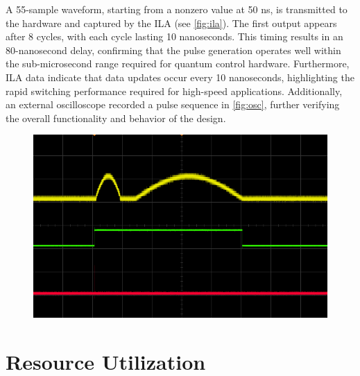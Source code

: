 A 55-sample waveform, starting from a nonzero value at 50 ns, is transmitted to the hardware and captured by the ILA (see \autoref{fig:ila}). The first output appears after 8 cycles, with each cycle lasting 10 nanoseconds. This timing results in an 80-nanosecond delay, confirming that the pulse generation operates well within the sub-microsecond range required for quantum control hardware. Furthermore, ILA data indicate that data updates occur every 10 nanoseconds, highlighting the rapid switching performance required for high-speed applications. Additionally, an external oscilloscope recorded a pulse sequence in \autoref{fig:osc}, further verifying the overall functionality and behavior of the design.
\begin{figure}[ht]
    \centering
    \includegraphics[width=.85\linewidth]{figures/one_trig_seq.png}
    \caption{}
    \label{fig:osc}
\end{figure}

\section{Resource Utilization}

